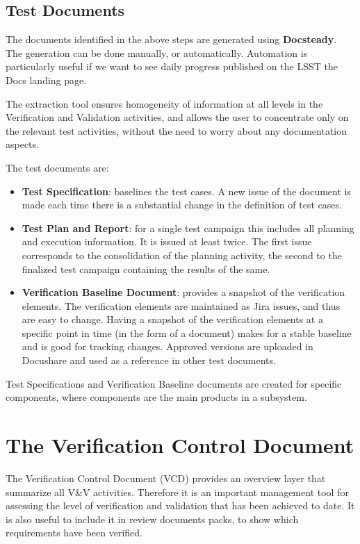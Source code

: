 \subsection{Test Documents}

The documents identified in the above steps are generated using  \textbf{Docsteady}.
The generation can be done manually, or automatically.
Automation is particularly useful if we want to see daily progress published on the LSST the Docs landing page.

The extraction tool ensures homogeneity of information at all levels in the Verification and Validation activities,
and allows the user to concentrate only on the relevant test activities, without the need to worry about any documentation aspects.

The test documents are:

\begin{itemize}
\item \textbf{Test Specification}:  baselines the test cases.
A new issue of the document is made each time there is a substantial change in the definition of test cases.
\item \textbf{Test Plan and Report}:  for a single test campaign this includes all planning and execution information.
It is issued at least twice. The first issue corresponds to the consolidation of the planning activity,
the second to the finalized test campaign containing the results of the same.
\item \textbf{Verification Baseline Document}: provides a snapshot of the verification elements.
The verification elements are  maintained as Jira issues, and  thus are easy to change.
Having a snapshot of the verification elements at a specific point in time  (in the form of a document) makes
for a stable baseline and is good for tracking changes.
Approved versions are uploaded in Docushare and used as a reference in other test documents.
\end{itemize}

Test Specifications and Verification Baseline documents are created for specific components, where components are the main products in a subsystem.


\section{The Verification Control Document}

The Verification Control Document (VCD) provides an overview layer that summarize all V\&V activities.
Therefore it is an important management tool for assessing the level of verification and validation that has been achieved to date.
It is also useful to include it in review documents packs, to show which requirements have been verified.

